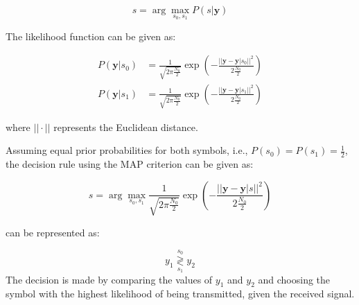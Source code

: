 \documentclass[12pt]{book}
\providecommand{\dec}[2]{\ensuremath{\overset{#1}{\underset{#2}{\gtrless}}}}
\begin{document}
\begin{enumerate}
\begin{equation}
s = \arg\max_{s_0,s_1} P(s|\mathbf{y})
\end{equation}

The likelihood function can be given as:

\begin{align}
P(\mathbf{y}|s_0) &= \frac{1}{\sqrt{2\pi \frac{N_0}{2}}} \exp \left(-\frac{||\mathbf{y} - \mathbf{y}|s_0||^2}{2\frac{N_0}{2}}\right) \\
P(\mathbf{y}|s_1) &= \frac{1}{\sqrt{2\pi \frac{N_0}{2}}} \exp \left(-\frac{||\mathbf{y} - \mathbf{y}|s_1||^2}{2\frac{N_0}{2}}\right)
\end{align}

where $||\cdot||$ represents the Euclidean distance.

Assuming equal prior probabilities for both symbols, i.e., $P(s_0) = P(s_1) = \frac{1}{2}$, the decision rule using the MAP criterion can be given as:

\begin{equation}
s = \arg\max_{s_0,s_1} \frac{1}{\sqrt{2\pi \frac{N_0}{2}}} \exp \left(-\frac{||\mathbf{y} - \mathbf{y}|s||^2}{2\frac{N_0}{2}}\right)
\end{equation}

can be represented as:

\begin{equation}
y_1 \dec{s_0}{s_1} y_2
\end{equation}
 The decision is made by comparing the values of $y_1$ and $y_2$ and choosing the symbol with the highest likelihood of being transmitted, given the received signal.

 \end{enumerate}
\end{document}
